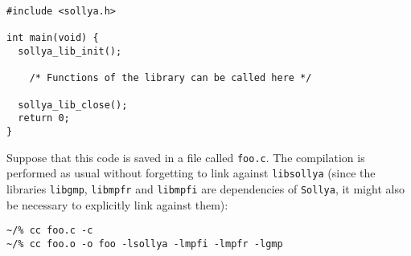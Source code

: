 \documentclass[a4paper]{article}
\newcommand{\sollya}{\texttt{Sollya}\xspace}
\begin{document}
\begin{center}\begin{minipage}{15cm}\begin{Verbatim}[frame=single]
#include <sollya.h>

int main(void) {
  sollya_lib_init();

    /* Functions of the library can be called here */

  sollya_lib_close();
  return 0;
}
\end{Verbatim}
\end{minipage}\end{center}

Suppose that this code is saved in a file called \texttt{foo.c}. The compilation is performed as usual without forgetting to link against \texttt{libsollya} (since the libraries \texttt{libgmp}, \texttt{libmpfr} and \texttt{libmpfi} are dependencies of \sollya, it might also be necessary to explicitly link against them):
\begin{center}\begin{minipage}{15cm}\begin{Verbatim}[frame=single]
~/% cc foo.c -c
~/% cc foo.o -o foo -lsollya -lmpfi -lmpfr -lgmp
\end{Verbatim}
\end{minipage}\end{center}
\end{document}

